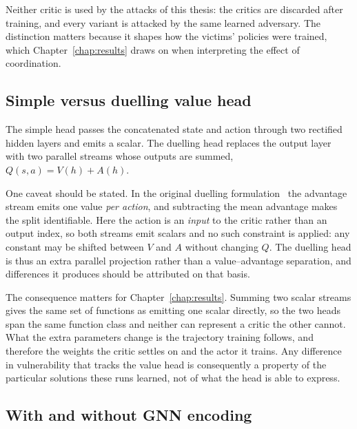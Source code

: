 Neither critic is used by the attacks of this thesis: the critics are discarded after
training, and every variant is attacked by the same learned adversary. The distinction
matters because it shapes how the victims' policies were trained, which
Chapter~\ref{chap:results} draws on when interpreting the effect of coordination.

\subsection{Simple versus duelling value head}
\label{subsec:axis_value_head}

The simple head passes the concatenated state and action through two rectified
hidden layers and emits a scalar. The duelling head replaces the output layer with
two parallel streams whose outputs are summed, $Q(s,a) = V(h) + A(h)$.

One caveat should be stated. In the original duelling
formulation~\cite{wang2016duelingnetworkarchitecturesdeep} the advantage
stream emits one value \emph{per action}, and subtracting the mean advantage makes
the split identifiable. Here the action is an \emph{input} to the critic rather than
an output index, so both streams emit scalars and no such constraint is applied: any
constant may be shifted between $V$ and $A$ without changing $Q$. The duelling head
is thus an extra parallel projection rather than a value--advantage separation, and
differences it produces should be attributed on that basis.

The consequence matters for Chapter~\ref{chap:results}. Summing two scalar streams gives
the same set of functions as emitting one scalar directly, so the two heads span the
same function class and neither can represent a critic the other cannot. What the extra
parameters change is the trajectory training follows, and therefore the weights the
critic settles on and the actor it trains. Any difference in vulnerability that tracks
the value head is consequently a property of the particular solutions these runs
learned, not of what the head is able to express.

\subsection{With and without GNN encoding}
\label{subsec:axis_gnn}

